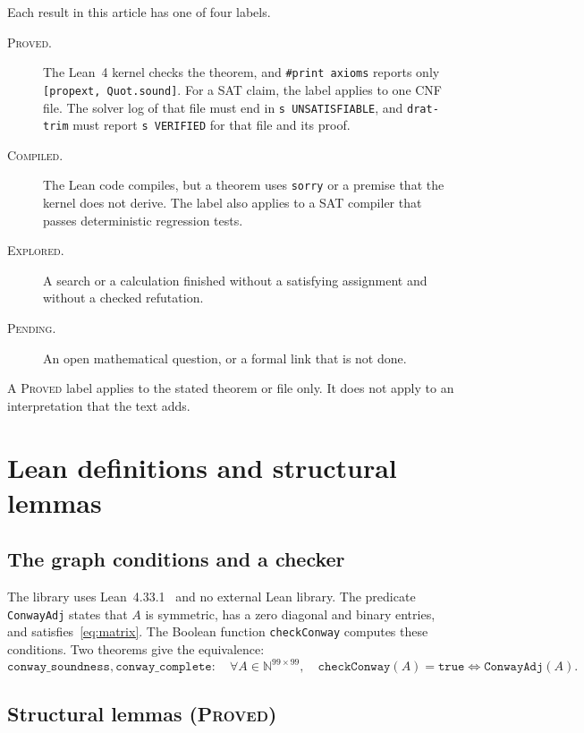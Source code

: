 \documentclass{article}
\theoremstyle{plain}
\theoremstyle{definition}
\numberwithin{equation}{section}
\begin{document}
Each result in this article has one of four labels.
\begin{description}
 \item[\textsc{Proved}.] The Lean~4 kernel checks the theorem, and \texttt{\#print axioms} reports only \texttt{[propext, Quot.sound]}. For a SAT claim, the label applies to one CNF file. The solver log of that file must end in \texttt{s UNSATISFIABLE}, and \texttt{drat-trim} must report \texttt{s VERIFIED} for that file and its proof.
 \item[\textsc{Compiled}.] The Lean code compiles, but a theorem uses \texttt{sorry} or a premise that the kernel does not derive. The label also applies to a SAT compiler that passes deterministic regression tests.
 \item[\textsc{Explored}.] A search or a calculation finished without a satisfying assignment and without a checked refutation.
 \item[\textsc{Pending}.] An open mathematical question, or a formal link that is not done.
\end{description}
A \textsc{Proved} label applies to the stated theorem or file only. It does not apply to an interpretation that the text adds.

\section{Lean definitions and structural lemmas}

\subsection{The graph conditions and a checker}

The library uses Lean~4.33.1~\cite{moura2021lean4} and no external Lean library.
The predicate \texttt{ConwayAdj} states that $A$ is symmetric, has a zero diagonal and binary entries, and satisfies~\eqref{eq:matrix}.
The Boolean function \texttt{checkConway} computes these conditions. Two theorems give the equivalence:
\begin{equation}
 \texttt{conway\_soundness}, \texttt{conway\_complete}: \quad \forall A \in \mathbb{N}^{99 \times 99}, \quad \texttt{checkConway}(A) = \texttt{true} \iff \texttt{ConwayAdj}(A).
 \label{eq:checker}
\end{equation}

\subsection{Structural lemmas (\textsc{Proved})}
\end{document}
